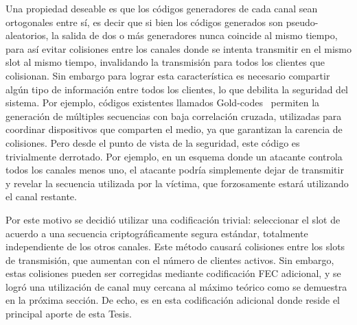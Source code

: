 Una propiedad deseable es que los códigos generadores de cada canal sean ortogonales entre sí, es decir que si bien los códigos generados son pseudo-aleatorios, la salida de dos o más generadores nunca coincide al mismo tiempo, para así evitar colisiones entre los canales donde se intenta transmitir en el mismo slot al mismo tiempo, invalidando la transmisión para todos los clientes que colisionan.
Sin embargo para lograr esta característica es necesario compartir algún tipo de información entre todos los clientes, lo que debilita la seguridad del sistema. Por ejemplo, códigos existentes llamados Gold-codes~\cite{gold1967optimal} permiten la generación de múltiples secuencias con baja correlación cruzada, utilizadas para coordinar dispositivos que comparten el medio, ya que garantizan la carencia de colisiones. Pero desde el punto de vista de la seguridad, este código es trivialmente derrotado. Por ejemplo, en un esquema donde un atacante controla todos los canales menos uno, el atacante podría simplemente dejar de transmitir y revelar la secuencia utilizada por la víctima, que forzosamente estará utilizando el canal restante.

Por este motivo se decidió utilizar una codificación trivial: seleccionar el slot de acuerdo a una secuencia criptográficamente segura estándar, totalmente independiente de los otros canales. Este método causará colisiones entre los slots de transmisión, que aumentan con el número de clientes activos. Sin embargo, estas colisiones pueden ser corregidas mediante codificación FEC adicional, y se logró una utilización de canal muy cercana al máximo teórico como se demuestra en la próxima sección. De echo, es en esta codificación adicional donde reside el principal aporte de esta Tesis.

